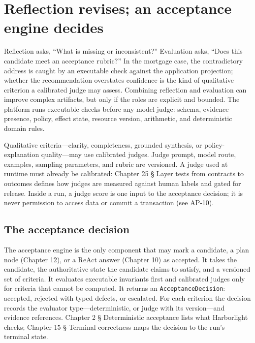 \section{Reflection revises; an acceptance engine decides}


Reflection asks, “What is missing or inconsistent?” Evaluation asks, “Does this candidate meet an acceptance rubric?” In the mortgage case, the contradictory address is caught by an executable check against the application projection; whether the recommendation overstates confidence is the kind of qualitative criterion a calibrated judge may assess. Combining reflection and evaluation can improve complex artifacts, but only if the roles are explicit and bounded. The platform runs executable checks before any model judge: schema, evidence presence, policy, effect state, resource version, arithmetic, and deterministic domain rules.\par

Qualitative criteria—clarity, completeness, grounded synthesis, or policy-explanation quality—may use calibrated judges. Judge prompt, model route, examples, sampling parameters, and rubric are versioned. A judge used at runtime must already be calibrated: Chapter 25 § Layer tests from contracts to outcomes defines how judges are measured against human labels and gated for release. Inside a run, a judge score is one input to the acceptance decision; it is never permission to access data or commit a transaction (see AP-10).\par

\subsection{The acceptance decision}

The acceptance engine is the only component that may mark a candidate, a plan node (Chapter 12), or a ReAct answer (Chapter 10) as accepted. It takes the candidate, the authoritative state the candidate claims to satisfy, and a versioned set of criteria. It evaluates executable invariants first and calibrated judges only for criteria that cannot be computed. It returns an \lstinline[style=bookinline]!AcceptanceDecision!: accepted, rejected with typed defects, or escalated. For each criterion the decision records the evaluator type—deterministic, or judge with its version—and evidence references. Chapter 2 § Deterministic acceptance lists what Harborlight checks; Chapter 15 § Terminal correctness maps the decision to the run's terminal state.\par

